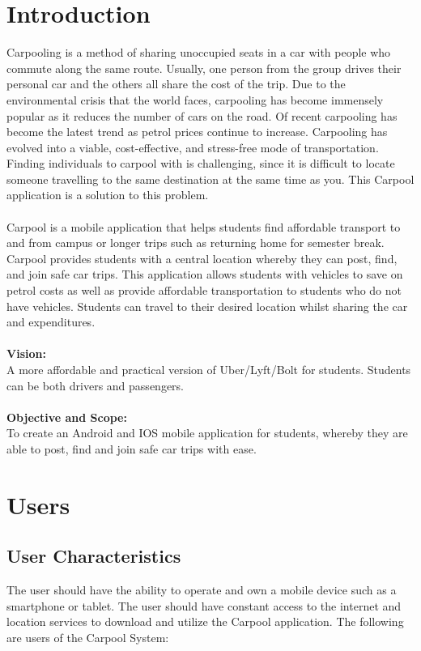\documentclass[hidelinks, 12pt, a4paper]{article}
\begin{document}
\section{Introduction}
Carpooling is a method of sharing unoccupied seats in a car with people who commute along the same route. Usually, one person from the group drives their personal car and the others all share the cost of the trip. Due to the environmental crisis that the world faces, carpooling has become immensely popular as it reduces the number of cars on the road. Of recent carpooling has become the latest trend as petrol prices continue to increase. Carpooling has evolved into a viable, cost-effective, and stress-free mode of transportation. Finding individuals to carpool with is challenging, since it is difficult to locate someone travelling to the same destination at the same time as you. This Carpool application is a solution to this problem. \\ \\
Carpool is a mobile application that helps students find affordable transport to and from campus or longer trips such as returning home for semester break. Carpool provides students with a central location whereby they can post, find, and join safe car trips. This application allows students with vehicles to save on petrol costs as well as provide affordable transportation to students who do not have vehicles. Students can travel to their desired location whilst sharing the car and expenditures.\\ \\
\textbf{Vision:}\\
A more affordable and practical version of Uber/Lyft/Bolt for students. Students can be both drivers and passengers.\\ \\
\textbf{Objective and Scope:} \\
To create an Android and IOS mobile application for students, whereby they are able to post, find and join safe car trips with ease.

\newpage
\section{Users}

\subsection{User Characteristics}

The user should have the ability to operate and own a mobile device such as a smartphone or tablet. The user should have constant access to the internet and location services to download and utilize the Carpool application. The following are users of the Carpool System:\\
\end{document}

